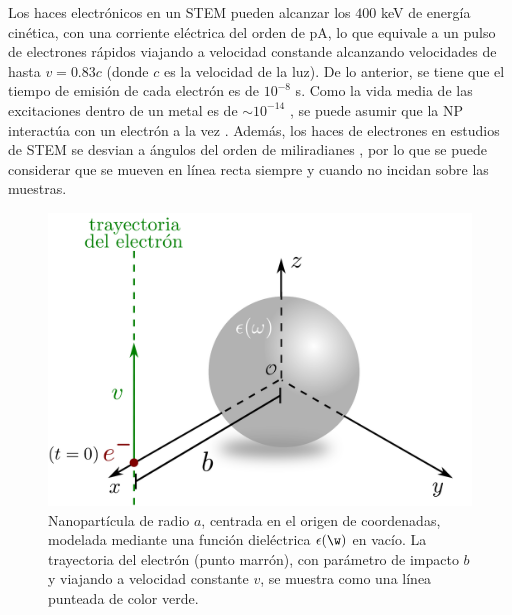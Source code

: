 Los haces electrónicos en un STEM pueden alcanzar los $400$ keV de energía cinética, con una corriente eléctrica del orden de pA, lo que equivale a un pulso de electrones rápidos viajando a velocidad constande alcanzando velocidades de hasta $v=0.83 c$ (donde $c$ es la velocidad de la luz). De lo anterior, se tiene que el tiempo de emisión de cada electrón es de $10^{-8}$ s. Como la vida media de las excitaciones dentro de un metal es de $\sim 10^{-14}$ \cite{quijada2010lifetime}, se puede asumir que la NP interactúa con un electrón a la vez \cite{de1999relativistic, GarciadeAbajo-1, deabajo2021optical}. Además,  los haces de electrones en estudios de STEM se desvian a ángulos del orden de miliradianes \cite{deabajo2021optical, Rivacoba1, krehl2018spectral}, por lo que se puede considerar que se mueven en línea recta siempre y cuando no incidan sobre las muestras. 

\begin{figure}[ht!]
\centering
\includegraphics[width=0.5\linewidth]{17-imagenes/1-Intro/system.pdf} 
\caption{Nanopartícula de radio $a$, centrada en el origen de coordenadas, modelada mediante una función dieléctrica $\epsilon(\w)$ en vacío. La trayectoria del electrón (punto marrón), con parámetro de impacto $b$ y viajando a velocidad constante $v$, se muestra como una línea punteada de color verde. }
\end{figure}


